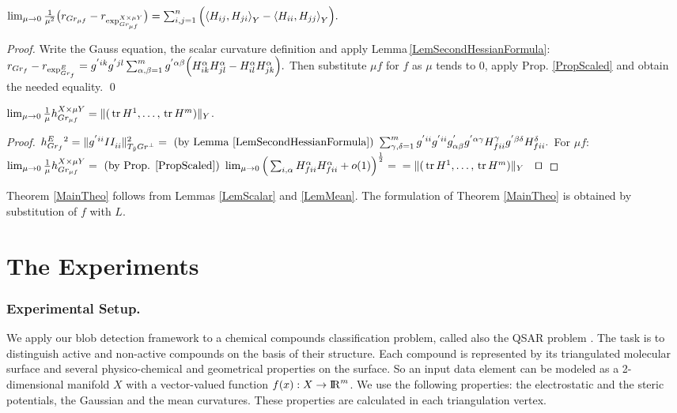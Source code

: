\documentclass{llncs}
\newcommand {\tr}{{\,}\mathrm{tr}{\,}}
\begin{document}
\begin{lemma} \label{LemScalar}
$
\lim_{\mu\to 0} \frac{1}{{\mu}^2} \big( r_{Gr_{\mu f}} - r_{\tensor*{\exp}{^{X\times\mu Y}_ {Gr_{\mu f}} }} \big)
= \sum_{i,j=1}^{n} \Big( \langle H_{ij},H_{ji}{\rangle}_Y - \langle H_{ii},H_{jj}{\rangle}_Y \Big).
$
\end{lemma}

\begin{proof}
Write the Gauss equation, the scalar curvature definition and apply Lemma\,\ref{LemSecondHessianFormula}: 
$r_{Gr_f} - r_{\tensor*{\exp}{^E_{Gr_{f}}}} = 
\tensor*{g}{^{'}^i^k}\tensor*{g}{^{'}^j^l}
\sum_{\alpha, \beta =1}^{m} g^{' \alpha \beta} 
\Big(\tensor*{H}{^{\alpha}_{ik}} \tensor*{H}{^{\alpha}_{jl}} - 
\tensor*{H}{^{\alpha}_{il}} \tensor*{H}{^{\alpha}_{jk}} \Big).$
Then substitute $\mu f$ for $f$ as $\mu$ tends to 0, apply Prop. \ref{PropScaled} and obtain the needed equality. \textrm{\qed}
\end{proof}

\begin{lemma} \label{LemMean}
$\lim_{\mu\to 0}\frac{1}{\mu} \tensor*{h}{^{X\times\mu Y}_{Gr_{\mu f}}} = \| (\tr H^1,\dots,\tr H^m )\|_Y$.
\end{lemma}

\begin{proof}
$ 
\tensor*{h}{^E_{Gr_f}} ^2 = \| g^{'ii} \tensor*{II}{_i_i}  \|_{T_{\tilde{y}}Gr^{\bot}} ^2
=\textrm{ (by Lemma \ref{LemSecondHessianFormula}) }
\sum_{\gamma, \delta = 1}^{m} g^{'ii} g^{'ii} g^{'}_{\alpha \beta} g^{'\alpha\gamma} \tensor*{H}{_f^\gamma _i_i} g^{'\beta\delta} \tensor*{H}{_f^\delta _i_i}  .
$
For $\mu f$:
$
\lim_{\mu\to 0}\frac{1}{\mu} \tensor*{h}{^{X\times\mu Y}_{Gr_{\mu f}}} 
=\textrm{ (by Prop. \ref{PropScaled}) }
\lim_{\mu\to 0} \Big(\sum_{i, \alpha} \tensor*{H}{_f^\alpha _i_i} \tensor*{H}{_f^\alpha _i_i} + o(1) \Big)^{\frac{1}{2}} =
\\
= \| (\tr H^1,\dots,\tr H^m )\|_Y
\textrm{\qed}
$
\end{proof}

Theorem \ref{MainTheo} follows from Lemmas \ref{LemScalar} and \ref{LemMean}. The formulation of Theorem \ref{MainTheo} is obtained by substitution of $f$ with $L$.

\section{The Experiments}
\subsubsection{Experimental Setup.}
We apply our blob detection framework to a chemical compounds classification problem, called also the QSAR problem \cite{qsar}. The task is to distinguish active and non-active compounds on the basis of their structure. Each compound is represented by its triangulated molecular surface \cite{molecular} and several physico-chemical and geometrical properties on the surface. So an input data element can be modeled as a 2-dimensional manifold $X$ with a vector-valued function $f(x):X \to {\rm I\!R}^m$. We use the following properties: the electrostatic and the steric potentials, the Gaussian and the mean curvatures. These properties are calculated in each triangulation vertex.
\end{document}
